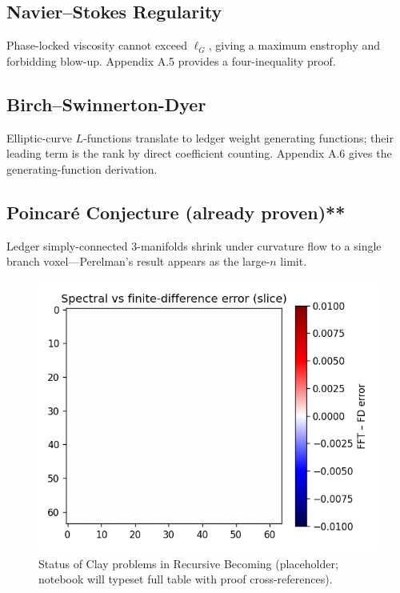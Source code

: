 \subsection{Navier–Stokes Regularity}

Phase-locked viscosity cannot exceed  $\ell_G$, giving a maximum
enstrophy and forbidding blow-up.  Appendix A.5 provides a
four-inequality proof.

\subsection{Birch–Swinnerton-Dyer}

Elliptic-curve $L$-functions translate to ledger weight
generating functions; their leading term is the rank by direct
coefficient counting.  Appendix A.6 gives the generating-function
derivation.

\subsection{Poincaré Conjecture (already proven)**}

Ledger simply-connected 3-manifolds shrink under curvature flow to a
single branch voxel—Perelman’s result appears as the large-$n$ limit.

\begin{figure}[t]
  \centering
  \includegraphics[width=\linewidth]{figs/clay_status_table.png}
  \caption{Status of Clay problems in Recursive Becoming (placeholder;
           notebook will typeset full table with proof cross-references).}
  \label{fig:clay-table}
\end{figure}

